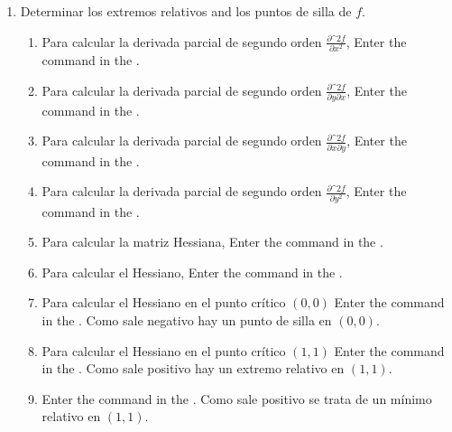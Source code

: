 \begin{enumerate}[leftmargin=*]
\begin{enumerate}
      \item Determinar los extremos relativos and los puntos de silla de $f$.
            \begin{indication}
            \begin{enumerate}
            \item Para calcular la derivada parcial de segundo orden $\frac{\partial\^2 f}{\partial x^2}$, Enter the command  in the .
            \item Para calcular la derivada parcial de segundo orden $\frac{\partial\^2 f}{\partial y\partial x}$, Enter the command  in the .
            \item Para calcular la derivada parcial de segundo orden $\frac{\partial\^2 f}{\partial x\partial y}$, Enter the command  in the .
            \item Para calcular la derivada parcial de segundo orden $\frac{\partial\^2 f}{\partial y^2}$, Enter the command  in the .
            \item Para calcular la matriz Hessiana, Enter the command  in the .
            \item Para calcular el Hessiano, Enter the command  in the .
            \item Para calcular el Hessiano en el punto crítico $(0,0)$ Enter the command  in the . Como sale negativo hay un punto de silla en $(0,0)$.
            \item Para calcular el Hessiano en el punto crítico $(1,1)$ Enter the command  in the . Como sale positivo hay un extremo relativo en $(1,1)$.
            \item Enter the command  in the . Como sale positivo se trata de un mínimo relativo en $(1,1)$.
            \end{enumerate}
            \end{indication}
      \end{enumerate}

\end{enumerate}


